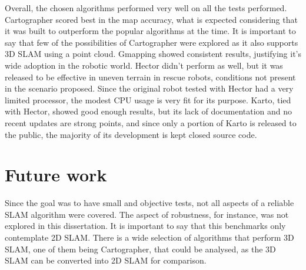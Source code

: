 Overall, the chosen algorithms performed very well on all the tests performed. Cartographer scored best in the map accuracy, what is expected considering that it was built to outperform the popular algorithms at the time. It is important to say that few of the possibilities of Cartographer were explored as it also supports 3D SLAM using a point cloud. Gmapping showed consistent results, justifying it's wide adoption in the robotic world. Hector didn't perform as well, but it was released to be effective in uneven terrain in rescue robots, conditions not present in the scenario proposed. Since the original robot tested with Hector had a very limited processor, the modest CPU usage is very fit for its purpose. Karto, tied with Hector, showed good enough results, but its lack of documentation and no recent updates are strong points, and since only a portion of Karto is released to the public, the majority of its development is kept closed source code.

\section{Future work}

Since the goal was to have small and objective tests, not all aspects of a reliable SLAM algorithm were covered. The aspect of robustness, for instance, was not explored in this dissertation. It is important to say that this benchmarks only contemplate 2D SLAM. There is a wide selection of algorithms that perform 3D SLAM, one of them being Cartographer, that could be analysed, as the 3D SLAM can be converted into 2D SLAM for comparison.

